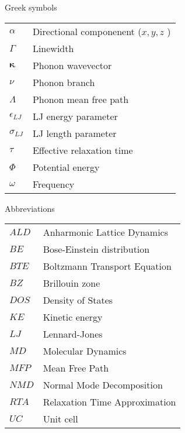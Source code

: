 Greek symbols\\
\begin{longtable}{ l l }
$\alpha$ & Directional componenent ($x,y,z$ )\\
$\Gamma$ & Linewidth\\
$\pmb{\kappa}$ & Phonon wavevector\\ 
$\nu$ & Phonon branch\\
$\Lambda$ & Phonon mean free path\\
$\epsilon_{LJ}$ & LJ energy parameter\\
$\sigma_{LJ}$ & LJ length parameter\\
$\tau$ & Effective relaxation time\\ 
$\Phi$ & Potential energy\\
$\omega$ & Frequency\\
\end{longtable}
\newpage
Abbreviations\\
\begin{longtable}{ l l }
$ALD$ & Anharmonic Lattice Dynamics \\
$BE$ & Bose-Einstein distribution \\
$BTE$ & Boltzmann Transport Equation \\
$BZ$ & Brillouin zone \\
$DOS$ & Density of States \\
$KE$ & Kinetic energy\\
$LJ$ & Lennard-Jones\\
$MD$ & Molecular Dynamics\\
$MFP$ & Mean Free Path\\
$NMD$ & Normal Mode Decomposition\\
$RTA$ & Relaxation Time Approximation\\
$UC$ & Unit cell\\
\end{longtable}
